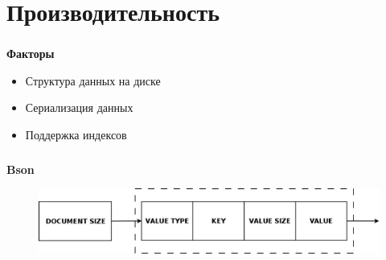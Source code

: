 \documentclass[18pt, compress, aspectratio=169]{beamer}
\begin{document}
\fontsize{13pt}{14}\selectfont
\section{Производительность}
\fontsize{17pt}{18}\selectfont

\begin{frame}
    \frametitle{}
    \begin{center}
        \textbf{Факторы}
        \pause
        \begin{itemize}[label={\MVRightarrow}]
            \item <+-> Структура данных на диске
            \item <+-> Сериализация данных
            \item <+-> Поддержка индексов
        \end{itemize}
    \end{center}
\end{frame}

\begin{frame}
    \frametitle{}
    \begin{center}
    \textbf{Bson}
    \begin{figure}
        \includegraphics[width=1.0\textwidth,center]{bson.png}
    \end{figure}
    \end{center}
\end{frame}

\end{document}
